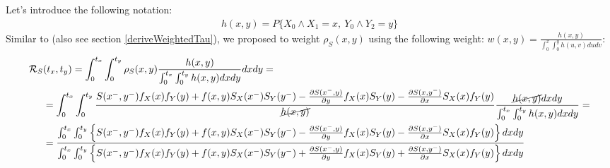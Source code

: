 \documentclass[]{article}
\begin{document}
Let's introduce the following notation:
	$$
	\begin{aligned}
		h(x, y) = P\{X_{0}\wedge X_{1} = x,~Y_{0}\wedge Y_{2} = y\}
	\end{aligned}
	$$
Similar to \cite{fan2000class} (also see section \ref{deriveWeightedTau}), we proposed to weight $\rho_S(x, y)$ using the following weight: $w(x, y) = \frac{h(x, y)}{\int_0^x \int_0^y h(u, v) dudv}$: 
	$$
	\begin{aligned}
		\mathcal{R}_S&(t_x, t_y) = \int_0^{t_x} \int_0^{t_y}  \rho_S(x, y)\frac{h(x, y)}{\int_0^{t_x} \int_0^{t_y} h(x, y) dxdy} dxdy = \\
    &= \int_0^{t_x} \int_0^{t_y}  \frac{  S(x^-,y^-)f_X(x)f_Y(y) + f(x, y)S_X(x^-)S_Y(y^-) - \frac{\partial S(x^-,y)}{\partial y}f_X(x)S_Y(y) - \frac{\partial S(x,y^-)}{\partial x}S_X(x)f_Y(y)  }{ \cancel{h(x,y)}}    
   \frac{\cancel{h(x, y)}dxdy}{\int_0^{t_x} \int_0^{t_y} h(x, y) dxdy}  = \\
    &=   \frac{ \int_0^{t_x} \int_0^{t_y} \left\{S(x^-,y^-)f_X(x)f_Y(y) + f(x, y)S_X(x^-)S_Y(y^-) - \frac{\partial S(x^-,y)}{\partial y}f_X(x)S_Y(y) - \frac{\partial S(x,y^-)}{\partial x}S_X(x)f_Y(y) \right\}dxdy }{\int_0^{t_x} \int_0^{t_y} \left\{S(x^-,y^-)f_X(x)f_Y(y) + f(x, y)S_X(x^-)S_Y(y^-) + \frac{\partial S(x^-,y)}{\partial y}f_X(x)S_Y(y) + \frac{\partial S(x,y^-)}{\partial x}S_X(x)f_Y(y) \right\}dxdy}\\
	\end{aligned}
	$$
\end{document}
